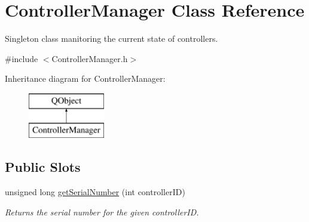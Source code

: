 \hypertarget{class_controller_manager}{}\section{Controller\+Manager Class Reference}
\label{class_controller_manager}


Singleton class manitoring the current state of controllers.  




{\ttfamily \#include $<$Controller\+Manager.\+h$>$}

Inheritance diagram for Controller\+Manager\+:\begin{figure}[H]
\begin{center}
\leavevmode
\includegraphics[height=2.000000cm]{class_controller_manager}
\end{center}
\end{figure}
\subsection*{Public Slots}
\begin{DoxyCompactItemize}
\item 
\mbox{\label{class_controller_manager_a5b496ff2650f4048dc91de9cdeea43c8}} 
unsigned long \hyperlink{class_controller_manager_a5b496ff2650f4048dc91de9cdeea43c8}{get\+Serial\+Number} (int controller\+ID)
\begin{DoxyCompactList}\small\item\em Returns the serial number for the given controller\+ID. \end{DoxyCompactList}\end{DoxyCompactItemize}

